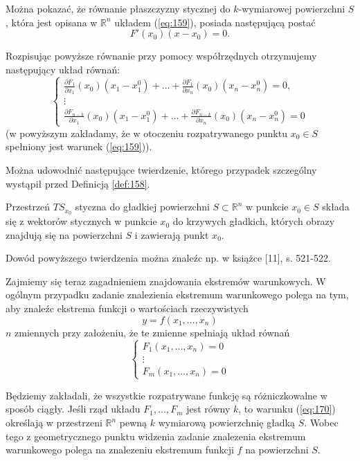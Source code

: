 \documentclass[leqno]{article}
\begin{document}
\begin{justify}
\begin{uwaga}
    Można pokazać, że równanie płaszczyzny stycznej do $k$-wymiarowej powierzchni $S$, która jest opisana w $\mathbb{R}^n$ układem (\ref{eq:159}), posiada następującą postać
    \[
        F'(x_0)(x - x_0) = 0.
    \]
\end{uwaga}
Rozpisując powyższe równanie przy pomocy współrzędnych otrzymujemy następujący układ równań:
\[
    \begin{cases}
        \frac{\partial F_1}{\partial x_1}(x_0)(x_1 - x_1^0) + \ldots + \frac{\partial F_1}{\partial x_n}(x_0)(x_n - x_n^0) = 0, \\
        \vdots \\
        \frac{\partial F_{n-k}}{\partial x_1}(x_0)(x_1 - x_1^0) + \ldots + \frac{\partial F_{n-k}}{\partial x_n}(x_0)(x_n - x_n^0) = 0
    \end{cases}
\]
(w powyższym zakładamy, że w otoczeniu rozpatrywanego punktu $x_0 \in S$ spełniony jest warunek (\ref{eq:159})).

Można udowodnić następujące twierdzenie, którego przypadek szczególny wystąpił przed Definicją \ref{def:158}.

\begin{theorem}
{
    Przestrzeń $TS_{x_0}$ styczna do gładkiej powierzchni $S \subset \mathbb{R}^n$ w punkcie $x_0 \in S$ składa się z wektorów stycznych 
    w punkcie $x_0$ do krzywych gładkich, których obrazy znajdują się na powierzchni $S$ i zawierają punkt $x_0$.
}
\end{theorem}

Dowód powyższego twierdzenia można znaleźc np. w książce [11], s. 521-522.

\newpage

Zajmiemy się teraz zagadnieniem znajdowania ekstremów warunkowych. W ogólnym przypadku zadanie znalezienia ekstremum warunkowego polega na tym, aby znaleźc ekstrema funkcji o wartościach rzeczywistych 
\[
    y = f(x_1, \ldots, x_n)
\]
$n$ zmiennych przy założeniu, że te zmienne spełniają układ równań 
\setcounter{equation}{169}
\begin{equation}\label{eq:170}
    \begin{cases}
        F_1(x_1, \ldots, x_n) = 0 \\ 
        \vdots \\
        F_m(x_1, \ldots, x_n) = 0
    \end{cases}
\end{equation}

Będziemy zakładali, że wszystkie rozpatrywane funkcję są różniczkowalne w sposób ciągły. Jeśli rząd układu $F_1, \ldots, F_m$ jest równy $k$, to 
warunku (\ref{eq:170}) określają w przestrzeni $\mathbb{R}^n$ pewną $k$ wymiarową powierzchnię gładką $S$. Wobec tego z geometrycznego punktu widzenia zadanie
znalezenia ekstremum warunkowego polega na znalezeniu ekstremum funkcji $f$ na powierzchni $S$. 


\end{justify}
\end{document}
